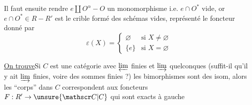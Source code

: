 Il faut ensuite rendre $e\amalg O^\alpha\mathbin{-}O$ un monomorphisme i.e.   $e\cap O^\ast$ vide, or $e\cap O^\ast\in R\mathbin{-}R'$ est le crible formé des schémas vides, représenté le foncteur  donné par
\[
\varepsilon(X)=\begin{cases}
\varnothing&\text{si }X\ne\varnothing\\
\{e\}&\text{si }X=\varnothing
\end{cases}
\]

\margin{$\Big\Vert$}\uline{On trouve}\quad Si $C$ est une catégorie avec $\varprojlim$ finies et $\varinjlim$ quelconques (suffit-il qu'il y ait $\varinjlim$ finies, voire des sommes finies ?)   les  bimorphismes sont des isom, alors les ``corps'' dans $C$ correspondent aux foncteurs $F:R'\to\unsure{\mathscr C|C}$ qui  sont exacts à gauche 

